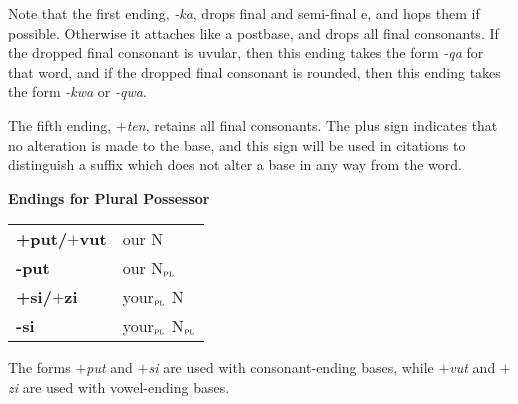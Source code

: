 \documentclass{article}
\begin{document}
\vspace{12pt}

Note that the first ending, \textit{-ka}, drops final and semi-final e, and hops them if possible.
%
Otherwise it attaches like a postbase, and drops all final consonants.
%
If the dropped final consonant is uvular, then this ending takes the form \textit{-qa} for that word, and if the dropped final consonant is rounded, then this ending takes the form \textit{-kwa} or \textit{-qwa}.

The fifth ending, \textit{$+$ten}, retains all final consonants.
%
The plus sign indicates that no alteration is made to the base, and this sign will be used in citations to distinguish a suffix which does not
alter a base in any way from the word.

\vspace{12pt}

\noindent \textbf{Endings for Plural Possessor}

\begin{tabular}{ l l }
\textbf{+put/$+$vut} & our N \\ 
\textbf{-put} & our N$_\text{\textsc{pl}}$ \\ 
\textbf{+si/$+$zi} & your$_\text{\textsc{pl}}$ N \\ 
\textbf{-si} & your$_\text{\textsc{pl}}$ N$_\text{\textsc{pl}}$ \\ 
\end{tabular}

\vspace{12pt}

The forms \textit{$+$put} and \textit{$+$si} are used with consonant-ending bases, while \textit{$+$vut} and \textit{$+$zi} are used with vowel-ending bases.
\end{document}
